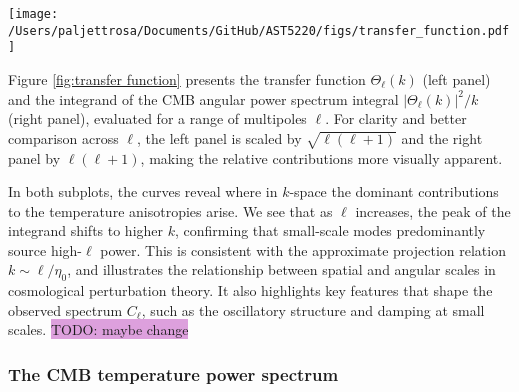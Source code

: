 \documentclass{aa}
\numberwithin{equation}{section}
\numberwithin{table}{section}
\numberwithin{figure}{section}
\begin{document}
\begin{figure*}
  \centering
  \texttt{[image: /Users/paljettrosa/Documents/GitHub/AST5220/figs/transfer\_function.pdf]}
  \caption{The transfer function $\Theta_\ell(k)$ (left) and the integrand $|\Theta_\ell(k)|^2/k$ (right) for selected multipoles $\ell$. The transfer function describes the projection of primordial perturbations onto angular scales today, while the integrand determines the contribution of each mode $k$ to the angular power spectrum $C_\ell$. \colorbox{Plum}{TODO: maybe change}}\label{fig:transfer function}
\end{figure*}

Figure \ref{fig:transfer function} presents the transfer function $\Theta_\ell(k)$ (left panel) and the integrand of the CMB angular power spectrum integral $|\Theta_\ell(k)|^2 / k$ (right panel), evaluated for a range of multipoles $\ell$. For clarity and better comparison across $\ell$, the left panel is scaled by $\sqrt{\ell(\ell+1)}$ and the right panel by $\ell(\ell+1)$, making the relative contributions more visually apparent.


In both subplots, the curves reveal where in $k$-space the dominant contributions to the temperature anisotropies arise. We see that as $\ell$ increases, the peak of the integrand shifts to higher $k$, confirming that small-scale modes predominantly source high-$\ell$ power. This is consistent with the approximate projection relation $k \sim \ell/\eta_0$, and illustrates the relationship between spatial and angular scales in cosmological perturbation theory. It also highlights key features that shape the observed spectrum $C_\ell$, such as the oscillatory structure and damping at small scales. \colorbox{Plum}{TODO: maybe change}


\subsubsection{The CMB temperature power spectrum}
\end{document}
